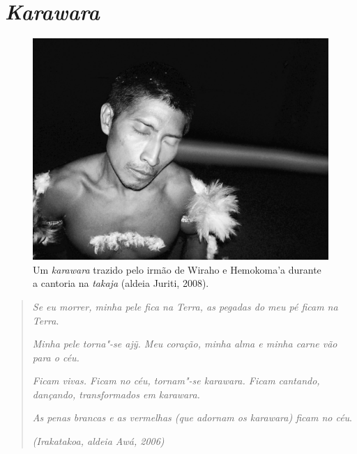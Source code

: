 
\chapter{\emph{Karawara}}\label{karawara}

\begin{figure}[H]
\centering
  \includegraphics[width=\textwidth]{./imgs/100_1752}
\caption{Um \emph{karawara} trazido pelo irmão de Wiraho e Hemokoma’a durante a cantoria na \emph{takaja} (aldeia Juriti, 2008).}
\end{figure}

\begin{quote}
\emph{Se eu morrer, minha pele fica na Terra, as pegadas do meu pé
ficam na Terra}.

\noindent
\emph{Minha pele torna"-se \emph{ajỹ.}  Meu coração, minha alma e minha carne vão
para o céu.}

\noindent
\emph{Ficam vivas. Ficam no céu, tornam"-se \emph{karawara}. Ficam cantando,
dançando, transformados em \emph{karawara}.}

\noindent
\emph{As penas brancas e as vermelhas (que adornam os \emph{karawara}) ficam no
céu}.

\begin{flushright}
\emph{(Irakatakoa, aldeia Awá, 2006)}\footnotemark
\end{flushright}

\end{quote}

